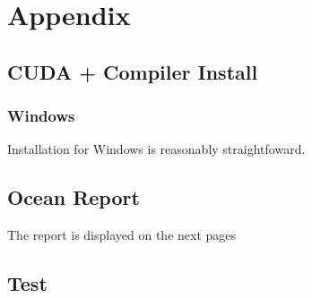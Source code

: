 \documentclass[11pt,letterpaper]{article}
\begin{document}
\section{Appendix}

\subsection{CUDA + Compiler Install}

\label{sec:compilerinstall}
\subsubsection{Windows}
Installation for Windows is reasonably straightfoward.

\subsection{Ocean Report}

The report is displayed on the next pages



\subsection{Test}
\end{document}
